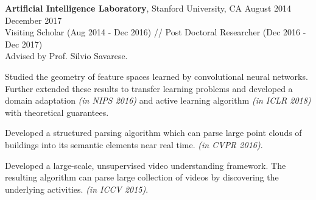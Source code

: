  \textbf{Artificial Intelligence Laboratory}, Stanford University, CA \hfill August 2014 \textendash ~ December 2017 \vspace{0.5mm}\\\vspace{0mm} 
  \hspace{-1.5mm} Visiting Scholar (Aug 2014 - Dec 2016) // Post Doctoral Researcher (Dec 2016 - Dec 2017)  \hfill \vspace{1mm} \\
 Advised by Prof. Silvio Savarese.

 Studied the geometry of feature spaces learned by convolutional neural networks. Further extended these results to transfer learning problems and developed a domain adaptation \emph{(in NIPS 2016)} and active learning algorithm \emph{(in ICLR 2018)} with theoretical guarantees. 
 
Developed a structured parsing algorithm which can parse large point clouds of buildings into its semantic elements near real time. \emph{(in CVPR 2016)}.

Developed a large-scale, unsupervised video understanding framework. The resulting algorithm can parse large collection of videos by discovering the underlying activities. \emph{(in ICCV 2015)}.